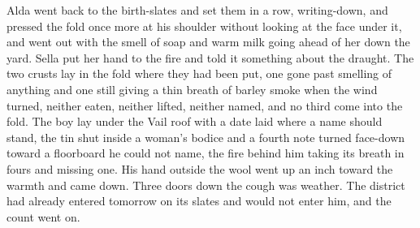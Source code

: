 Alda went back to the birth-slates and set them in a row, writing-down, and pressed the fold once more at his shoulder without looking at the face under it, and went out with the smell of soap and warm milk going ahead of her down the yard. Sella put her hand to the fire and told it something about the draught. The two crusts lay in the fold where they had been put, one gone past smelling of anything and one still giving a thin breath of barley smoke when the wind turned, neither eaten, neither lifted, neither named, and no third come into the fold. The boy lay under the Vail roof with a date laid where a name should stand, the tin shut inside a woman's bodice and a fourth note turned face-down toward a floorboard he could not name, the fire behind him taking its breath in fours and missing one. His hand outside the wool went up an inch toward the warmth and came down. Three doors down the cough was weather. The district had already entered tomorrow on its slates and would not enter him, and the count went on.
